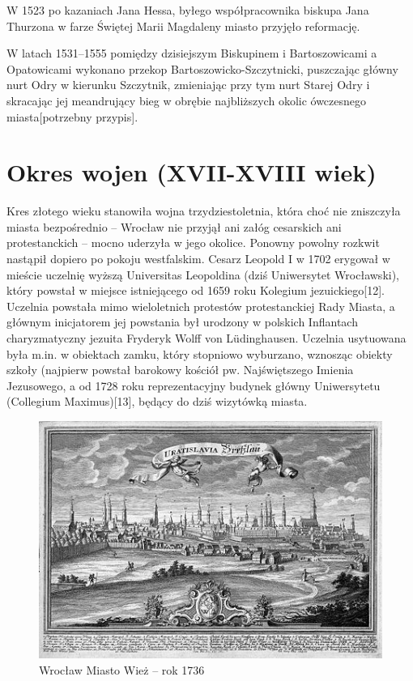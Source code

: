 \documentclass{article}
\begin{document}
W 1523 po kazaniach Jana Hessa, byłego współpracownika biskupa Jana Thurzona w farze Świętej Marii Magdaleny miasto przyjęło reformację.

W latach 1531–1555 pomiędzy dzisiejszym Biskupinem i Bartoszowicami a Opatowicami wykonano przekop Bartoszowicko-Szczytnicki, puszczając główny nurt Odry w kierunku Szczytnik, zmieniając przy tym nurt Starej Odry i skracając jej meandrujący bieg w obrębie najbliższych okolic ówczesnego miasta[potrzebny przypis].

\section{Okres wojen (XVII-XVIII wiek)}
\hrulefill

Kres złotego wieku stanowiła wojna trzydziestoletnia, która choć nie zniszczyła miasta bezpośrednio – Wrocław nie przyjął ani załóg cesarskich ani protestanckich – mocno uderzyła w jego okolice. Ponowny powolny rozkwit nastąpił dopiero po pokoju westfalskim. Cesarz Leopold I w 1702 erygował w mieście uczelnię wyższą Universitas Leopoldina (dziś Uniwersytet Wrocławski), który powstał w miejsce istniejącego od 1659 roku Kolegium jezuickiego[12]. Uczelnia powstała mimo wieloletnich protestów protestanckiej Rady Miasta, a głównym inicjatorem jej powstania był urodzony w polskich Inflantach charyzmatyczny jezuita Fryderyk Wolff von Lüdinghausen. Uczelnia usytuowana była m.in. w obiektach zamku, który stopniowo wyburzano, wznosząc obiekty szkoły (najpierw powstał barokowy kościół pw. Najświętszego Imienia Jezusowego, a od 1728 roku reprezentacyjny budynek główny Uniwersytetu (Collegium Maximus)[13], będący do dziś wizytówką miasta.
 \begin{figure}[h!]
\centering
\includegraphics[scale=0.4]{5.jpg}
\caption{Wrocław Miasto Wież – rok 1736}
\end{figure}
\end{document}

